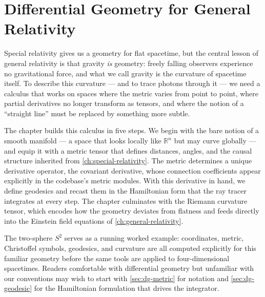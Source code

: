 \chapter{Differential Geometry for General Relativity}
\label{ch:differential-geometry}

Special relativity gives us a geometry for flat spacetime, but the central
lesson of general relativity is that gravity \emph{is} geometry: freely falling
observers experience no gravitational force, and what we call gravity is the
curvature of spacetime itself.  To describe this curvature --- and to trace
photons through it --- we need a calculus that works on spaces where the metric
varies from point to point, where partial derivatives no longer transform as
tensors, and where the notion of a ``straight line'' must be replaced by
something more subtle.

The chapter builds this calculus in five steps.  We begin with the bare notion
of a smooth manifold --- a space that looks locally like $\mathbb{R}^n$ but may
curve globally --- and equip it with a metric tensor that defines distances,
angles, and the causal structure inherited from \cref{ch:special-relativity}.
The metric determines a unique derivative operator, the covariant derivative,
whose connection coefficients appear explicitly in the codebase's metric
modules.  With this derivative in hand, we define geodesics and recast them in
the Hamiltonian form that the ray tracer integrates at every step.  The chapter
culminates with the Riemann curvature tensor, which encodes how the geometry
deviates from flatness and feeds directly into the Einstein field equations of
\cref{ch:general-relativity}.

The two-sphere $S^2$ serves as a running worked example: coordinates, metric,
Christoffel symbols, geodesics, and curvature are all computed explicitly for
this familiar geometry before the same tools are applied to four-dimensional
spacetimes.  Readers comfortable with differential geometry but unfamiliar with
our conventions may wish to start with \cref{sec:dg-metric} for notation and
\cref{sec:dg-geodesic} for the Hamiltonian formulation that drives the
integrator.











